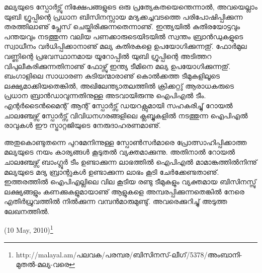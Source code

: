 മല്യയുടെ സ്പോര്‍ട്സു് നിക്ഷേപങ്ങളുടെ ഒരു പ്രത്യേകതയെന്തെന്നാല്‍, അവയെല്ലാം യുബി ഗ്രൂപ്പിന്റെ പ്രധാന ബിസിനസ്സായ 
മദ്യക്കച്ചവടത്തെ പരിപോഷിപ്പിക്കുന്ന തരത്തിലാണു് പ്ലേസ് ചെയ്തിരിക്കുന്നതെന്നാണു്. ഇന്ത്യയില്‍ കുതിരയോട്ടവും പന്തയവും 
നടത്തുന്ന വലിയ പണക്കാരുടെയിടയില്‍ സ്വന്തം ബ്രാന്‍ഡുകളുടെ സ്വാധീനം വര്‍ധിപ്പിക്കാനാണു് മല്യ കുതിരകളെ 
ഉപയോഗിക്കുന്നതു്. ഫോര്‍മുല വണ്ണിന്റെ പ്രഭവസ്ഥാനമായ യൂറോപ്പില്‍ യുബി ഗ്രൂപ്പിന്റെ അടിത്തറ വിപുലീകരിക്കുന്നതിനാണു് 
ഫോഴ്സു് ഇന്ത്യ ടീമിനെ മല്യ ഉപയോഗിക്കുന്നതു്. ബംഗാളിലെ സാധാരണ കുടിയന്മാരാണു് കൊല്‍ക്കത്ത ടീമുകളിലൂടെ 
ലക്ഷ്യമാക്കിയതെങ്കില്‍, അഖിലേന്ത്യാതലത്തില്‍ ക്രിക്കറ്റു് ആരാധകരുടെ പ്രധാന ബ്രാന്‍ഡാവുന്നതിനുള്ള 
അടവായിരുന്നു ഐപിഎല്‍ ടീം. എന്റര്‍ടൈന്‍മൈന്റ് ആന്റ് സ്പോര്‍ട്സ് ഡയറക്റ്റുമായി സഹകരിച്ചു് റോയല്‍ ചാലഞ്ചേഴ്സ് സ്പോര്‍ട്സ് 
വിവിധനഗരങ്ങളിലെ ക്ലബ്ബുകളില്‍ നടത്തുന്ന ഐപിഎല്‍ രാവുകള്‍ ഈ സ്ട്രാറ്റജിയുടെ നേരുദാഹരണമാണു്.

അതുകൊണ്ടുതന്നെ പുറമേനിന്നുള്ള സ്പോണ്‍സര്‍മാരെ പ്രോത്സാഹിപ്പിക്കാത്ത മല്യയുടെ നയം കാര്യങ്ങള്‍ കൂടുതല്‍ 
വ്യക്തമാക്കുന്നു. അതിനാല്‍ റോയല്‍ ചാലഞ്ചേഴ്സ് ബാംഗ്ലൂര്‍ ടീം ഉണ്ടാക്കുന്ന ലാഭത്തില്‍ ഐപിഎല്‍ മാമാങ്കത്തില്‍നിന്നു് 
മല്യയുടെ മദ്യ ബ്രാന്റുകള്‍ ഉണ്ടാക്കുന്ന ലാഭം കൂടി ചേര്‍ക്കേണ്ടതാണു്. ഇത്തരത്തില്‍ ഐപിഎല്ലിലെ വില കൂടിയ 
രണ്ടു ടീമുകളും വ്യക്തമായ ബിസിനസ്സു് ലക്ഷ്യങ്ങളും കണക്കുകളുമായാണു് ആളുകളെ അമ്പരപ്പിക്കുന്നതെങ്കില്‍ നേരെ 
എതിര്‍ധ്രുവത്തില്‍ നില്‍ക്കുന്ന വമ്പന്‍മാരുമുണ്ടു്. അവരെക്കുറിച്ചു് അടുത്ത ലേഖനത്തില്‍.

\begin{flushright}(10 May, 2010)\footnote{http://malayal.am/പലവക/പരമ്പര/ബിസിനസ്-ലീഗ്/5378/അംബാനി-മുതല്‍-മല്യ-വരെ}\end{flushright}

\newpage
